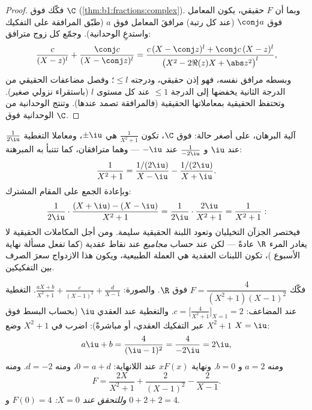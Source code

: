 \begin{proof}
فكّك فوق $\C$ (\cref{thm:b1:fractions:complex}). وبما أن $F$
حقيقي، يكون المعامل فوق  $\conj a$ (عند كل رتبة)
مرافقَ المعامل فوق $a$ (طبّق المرافقة على
التفكيك واستدعِ الوحدانية). وجمّع كل زوج مترافق:
\[
\frac{c}{(X - z)^l} + \frac{\conj c}{(X - \conj z)^l}
= \frac{c\,(X - \conj z)^l + \conj c\,(X - z)^l}{\bigl(X^2 - 2\Re(z)X
+ \abs z^2\bigr)^{l}},
\]
وبسطه مرافق نفسه، فهو إذن حقيقي، ودرجته $\leq l$؛
وفصل مضاعفات  الحقيقي من الدرجة الثانية يخفضها إلى الدرجة
$\leq 1$ عند كل مستوى $l$ (باستقراء نزولي صغير). وتحتفظ 
الحقيقية بمعاملاتها الحقيقية (فالمرافقة تصمد عندها). وتنتج الوحدانية
من الوحدانية فوق $\C$.
\end{proof}

\begin{example}\label{ex:b1:fractions:pairing}
آلية البرهان، على أصغر حالة: فوق $\C$، تكون
 $\frac1{X^2+1}$ هي $\pm\iu$، ومعاملا التغطية
$\frac1{2\iu}$ عند $\iu$ و $\frac1{-2\iu}$ عند $-\iu$ ---
وهما مترافقان، كما تتنبأ به المبرهنة:
\[
\frac{1}{X^2 + 1}
= \frac{1/(2\iu)}{X - \iu} - \frac{1/(2\iu)}{X + \iu} .
\]
وبإعادة الجمع على المقام المشترك:
\[
\frac{1}{2\iu}\cdot\frac{(X + \iu) - (X - \iu)}{X^2 + 1}
= \frac{1}{2\iu}\cdot\frac{2\iu}{X^2 + 1} = \frac{1}{X^2+1} :
\]
فيختصر الجزآن التخيليان وتعود اللبنة الحقيقية سليمة.
ومن أجل المكاملات الحقيقية لا يغادر المرء $\R$ عادةً --- لكن عند
حساب \emph{مجاميع} عند نقاط عقدية (كما تفعل مسألة نهاية الأسبوع
)، تكون اللبنات العقدية هي العملة الطبيعية،
ويكون هذا الازدواج سعرَ الصرف بين التفكيكين.
\end{example}

\begin{example}\label{ex:b1:fractions:real}
فكّك $F = \dfrac{4}{(X^2+1)(X-1)^2}$ فوق $\R$. والصورة:
$\frac{aX + b}{X^2 + 1} + \frac{c}{(X-1)^2} + \frac{d}{X - 1}$.
التغطية عند  المضاعف: $c = \bigl[\frac{4}{X^2+1}\bigr]_{X=1} =
2$. والتغطية عند  العقدي $\iu$ (بحساب البسط فوق $X^2 + 1$
عبر التفكيك العقدي، أو مباشرةً): اضرب في
$X^2 + 1$ وضع $X = \iu$:
\[
a\iu + b = \frac{4}{(\iu - 1)^2} = \frac{4}{-2\iu} = 2\iu ,
\]
ومنه $a = 2$ و $b = 0$. ونهاية $xF(x)$ عند اللانهاية: $0 = a + d$، ومنه $d
= -2$. ومنه
\[
F = \frac{2X}{X^2+1} + \frac{2}{(X-1)^2} - \frac{2}{X-1} .
\]
\emph{وللتحقق عند $X = 0$:} $F(0) = 4$ و $0 + 2 + 2 = 4$.
\end{example}

